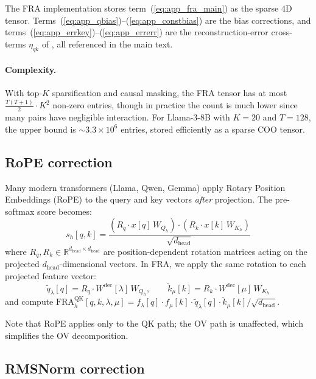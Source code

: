 \documentclass{article} %
\theoremstyle{plain}
\theoremstyle{definition}
\theoremstyle{remark}
\newcommand{\Wdec}{W^{\mathrm{dec}}}
\newcommand{\dhead}{d_{\mathrm{head}}}
\newcommand{\flambda}{f_\lambda}
\newcommand{\fmu}{f_\mu}
\newcommand{\RR}{\mathbb{R}}
\begin{document}
The FRA implementation stores term~(\ref{eq:app_fra_main}) as the sparse 4D tensor. Terms~(\ref{eq:app_qbias})--(\ref{eq:app_constbias}) are the bias corrections, and terms~(\ref{eq:app_errkey})--(\ref{eq:app_errerr}) are the reconstruction-error cross-terms $\eta_{qk}$ of , all referenced in the main text.

\paragraph{Complexity.} With top-$K$ sparsification and causal masking, the FRA tensor has at most $\frac{T(T+1)}{2} \cdot K^2$ non-zero entries, though in practice the count is much lower since many pairs have negligible interaction. For Llama-3-8B with $K{=}20$ and $T{=}128$, the upper bound is ${\sim}3.3 \times 10^6$ entries, stored efficiently as a sparse COO tensor.

\subsection{RoPE correction}
\label{app:rope}

Many modern transformers (Llama, Qwen, Gemma) apply Rotary Position Embeddings (RoPE) to the query and key vectors \emph{after} projection. The pre-softmax score becomes:
\begin{equation}
    s_h[q,k] = \frac{\left(R_q \cdot x[q]\,W_{Q_h} \right) \cdot \left( R_k \cdot x[k]\,W_{K_h} \right)}{\sqrt{\dhead}}
\end{equation}
where $R_q, R_k \in \RR^{\dhead \times \dhead}$ are position-dependent rotation matrices acting on the projected $\dhead$-dimensional vectors. In FRA, we apply the same rotation to each projected feature vector:
\begin{equation}
    \tilde{q}_\lambda[q] = R_q \cdot \Wdec[\lambda]\,W_{Q_h}, \qquad \tilde{k}_\mu[k] = R_k \cdot \Wdec[\mu]\,W_{K_h}
\end{equation}
and compute $\mathrm{FRA}^{\mathrm{QK}}_h[q,k,\lambda,\mu] = \flambda[q] \cdot \fmu[k] \cdot \tilde{q}_\lambda[q] \cdot \tilde{k}_\mu[k] / \sqrt{\dhead}$.

Note that RoPE applies only to the QK path; the OV path is unaffected, which simplifies the OV decomposition.

\subsection{RMSNorm correction}
\label{app:rms}
\end{document}
